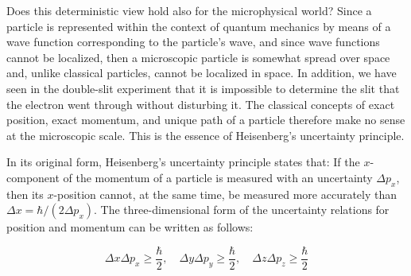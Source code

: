 \documentclass[10pt]{article}
\begin{document}
Does this deterministic view hold also for the microphysical world? Since a particle is represented within the context of quantum mechanics by means of a wave function corresponding to the particle's wave, and since wave functions cannot be localized, then a microscopic particle is somewhat spread over space and, unlike classical particles, cannot be localized in space. In addition, we have seen in the double-slit experiment that it is impossible to determine the slit that the electron went through without disturbing it. The classical concepts of exact position, exact momentum, and unique path of a particle therefore make no sense at the microscopic scale. This is the essence of Heisenberg's uncertainty principle.

In its original form, Heisenberg's uncertainty principle states that: If the $x$-component of the momentum of a particle is measured with an uncertainty $\Delta p_{x}$, then its $x$-position cannot, at the same time, be measured more accurately than $\Delta x=\hbar /\left(2 \Delta p_{x}\right)$. The three-dimensional form of the uncertainty relations for position and momentum can be written as follows:


\begin{equation*}
\Delta x \Delta p_{x} \geq \frac{\hbar}{2}, \quad \Delta y \Delta p_{y} \geq \frac{\hbar}{2}, \quad \Delta z \Delta p_{z} \geq \frac{\hbar}{2} \tag{1.57}
\end{equation*}
\end{document}
